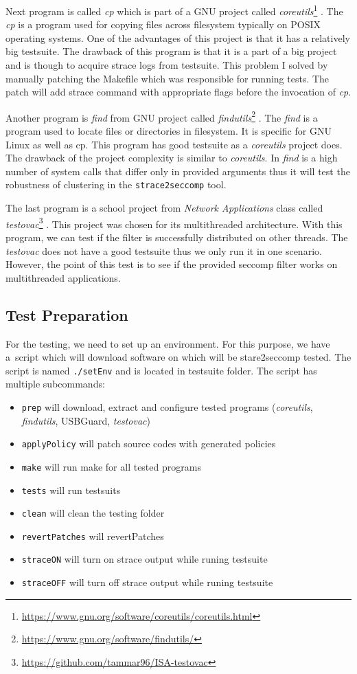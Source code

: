 Next program is called \emph{cp} which is part of a GNU project called
\emph{coreutils}\footnote{\url{https://www.gnu.org/software/coreutils/coreutils.html}} .
The \emph{cp} is a program used for copying files across filesystem typically on
POSIX operating systems. One of the advantages of this project is that it has a
relatively big testsuite. The drawback of this program is that it is a part of a
big project and is though to acquire strace logs from testsuite. This problem I
solved by manually patching the Makefile which was responsible for running
tests. The patch will add strace command with appropriate flags before the
invocation of \emph{cp}.

Another program is \emph{find} from GNU project called
\emph{findutils}\footnote{\url{https://www.gnu.org/software/findutils/}} . The
\emph{find} is a program used to locate files or directories in filesystem. It
is specific for GNU Linux as well as cp. This program has good testsuite as a
\emph{coreutils} project does. The drawback of the project complexity is similar to
\emph{coreutils}. In \emph{find} is a high number of system calls that differ
only in provided arguments thus it will test the robustness of clustering in the
\texttt{strace2seccomp} tool.

The last program is a school project from \emph{Network Applications} class called
\emph{testovac}\footnote{\url{https://github.com/tammar96/ISA-testovac}} . This
project was chosen for its multithreaded architecture. With this program, we can
test if the filter is successfully distributed on other threads. The
\emph{testovac} does not have a good testsuite thus we only run it in one
scenario. However, the point of this test is to see if the provided seccomp
filter works on multithreaded applications.

\subsection{Test Preparation}
For the testing, we need to set up an environment. For this purpose, we have
a~script which will download software on which will be stare2seccomp tested. The
script is named \texttt{./setEnv} and is located in testsuite folder.
The script has multiple subcommands:
\begin{itemize}
	\item \texttt{prep} will download, extract and configure tested programs
		(\emph{coreutils}, \emph{findutils}, USBGuard, \emph{testovac})
	\item \texttt{applyPolicy} will patch source codes with generated policies
	\item \texttt{make} will run make for all tested programs
	\item \texttt{tests} will run testsuits
	\item \texttt{clean} will clean the testing folder
	\item \texttt{revertPatches} will revertPatches
	\item \texttt{straceON} will turn on strace output while runing testsuite
	\item \texttt{straceOFF} will turn off strace output while runing testsuite
\end{itemize}

